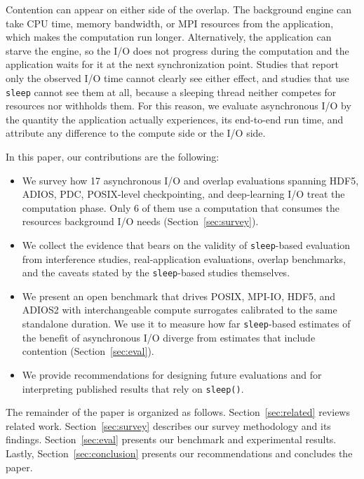 Contention can appear on either side of the overlap. The background engine
can take CPU time, memory bandwidth, or MPI resources from the application,
which makes the computation run longer. Alternatively, the application can
starve the engine, so the I/O does not progress during the computation and
the application waits for it at the next synchronization point. Studies that
report only the observed I/O time cannot clearly see either effect, and
studies that use \texttt{sleep} cannot see them at all, because a sleeping
thread neither competes for resources nor withholds them. For this reason,
we evaluate asynchronous I/O by the quantity the application actually
experiences, its end-to-end run time, and attribute any difference to the
compute side or the I/O side.

In this paper, our contributions are the following:
\begin{itemize}
  \item We survey how 17 asynchronous I/O and overlap evaluations spanning
        HDF5, ADIOS, PDC, POSIX-level checkpointing, and deep-learning I/O
        treat the computation phase. Only 6 of them use a computation that
        consumes the resources background I/O needs
        (Section~\ref{sec:survey}).
  \item We collect the evidence that bears on the validity of
        \texttt{sleep}-based evaluation from interference studies,
        real-application evaluations, overlap benchmarks, and the caveats
        stated by the \texttt{sleep}-based studies themselves.
  \item We present an open benchmark that drives POSIX, MPI-IO, HDF5, and
        ADIOS2 with interchangeable compute surrogates calibrated to the same
        standalone duration. We use it to measure how far
        \texttt{sleep}-based estimates of the benefit of asynchronous I/O
        diverge from estimates that include contention
        (Section~\ref{sec:eval}).
  \item We provide recommendations for designing future evaluations and for
        interpreting published results that rely on \texttt{sleep()}.
\end{itemize}

The remainder of the paper is organized as follows.
Section~\ref{sec:related} reviews related work. Section~\ref{sec:survey}
describes our survey methodology and its findings. Section~\ref{sec:eval}
presents our benchmark and experimental results. Lastly,
Section~\ref{sec:conclusion} presents our recommendations and concludes the
paper.
